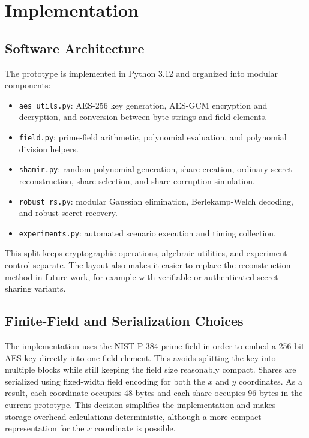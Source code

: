 \section{Implementation}

\subsection{Software Architecture}

The prototype is implemented in Python 3.12 and organized into modular components:
\begin{itemize}
\item \texttt{aes\_utils.py}: AES-256 key generation, AES-GCM encryption and decryption, and conversion between byte strings and field elements.
\item \texttt{field.py}: prime-field arithmetic, polynomial evaluation, and polynomial division helpers.
\item \texttt{shamir.py}: random polynomial generation, share creation, ordinary secret reconstruction, share selection, and share corruption simulation.
\item \texttt{robust\_rs.py}: modular Gaussian elimination, Berlekamp-Welch decoding, and robust secret recovery.
\item \texttt{experiments.py}: automated scenario execution and timing collection.
\end{itemize}

This split keeps cryptographic operations, algebraic utilities, and experiment control separate. The layout also makes it easier to replace the reconstruction method in future work, for example with verifiable or authenticated secret sharing variants.

\subsection{Finite-Field and Serialization Choices}

The implementation uses the NIST P-384 prime field in order to embed a 256-bit AES key directly into one field element. This avoids splitting the key into multiple blocks while still keeping the field size reasonably compact. Shares are serialized using fixed-width field encoding for both the $x$ and $y$ coordinates. As a result, each coordinate occupies 48 bytes and each share occupies 96 bytes in the current prototype. This decision simplifies the implementation and makes storage-overhead calculations deterministic, although a more compact representation for the $x$ coordinate is possible.

